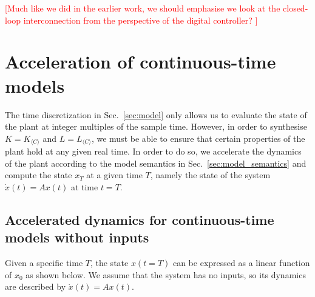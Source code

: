\documentclass[sigconf]{llncs}
\newcommand{\mat}[1]{{#1}}
\renewcommand{\vec}[1]{{#1}}
\renewcommand{\note}[1]{\textcolor{red}{[#1]}}
\begin{document}
\note{Much like we did in the earlier work, we should emphasise we look at the closed-loop interconnection from the perspective of the digital controller? }

 \section{Acceleration of continuous-time models}\label{sec:continuous_time_accel}
 The time discretization in Sec.~\ref{sec:model} only 
 allows us to evaluate the state of the plant at integer multiples of the sample time.
 However, in order to synthesise $\mat{K}=\mat{K}_{\langle C \rangle}$ and $\mat{L}=\mat{L}_{\langle C \rangle}$, 
 we must be able to ensure that certain properties of the plant hold at any given real time.
 In order to do so, 
 we accelerate the dynamics of the plant according to the model semantics in Sec.~\ref{sec:model_semantics} and compute the state $\vec{x}_T$  at a given time $T$, 
namely the state of the system $\dot{\vec{x}}(t)=\mat{A}\vec{x}(t)$ at time $t=T$.

 \subsection{Accelerated\! dynamics\! for\! continuous-time\! models\! without\! inputs}\label{sec:cont_acc_no_inputs}
 Given a specific time $T$, the state $\vec{x}(t=T)$ can be expressed as a linear function of $\vec{x}_0$ as shown below.
We assume that the system has no inputs, so its dynamics are described by $\dot{\vec{x}}(t)=\mat{A}\vec{x}(t)$.
 
\end{document}
